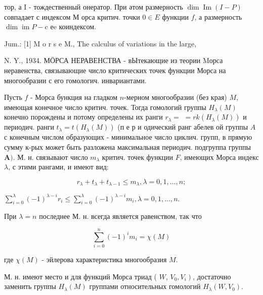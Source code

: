 \documentclass[10pt]{article}
\begin{document}
тор, а I - тождественный онератор. При әтом размерность $\operatorname{dim} \operatorname{Im}(I-P)$ совпадает с индексом М орса критич. точки $0 \in E$ функции $f$, а размерность $\operatorname{dim} \operatorname{im} P-\mathrm{c}$ еe коиндексом.



Jum.: [1] M o r s e M., The calculus of variations in the large,

N. Y., 1934. МӦРСА НЕРАВЕНСТВА - вЫтекающие из теории Mорса неравенства, связывающие число критических точек функции Морса на многообразии с его гомологич. инвариантами.



Пусть $f$ - Морса бункция на гладком $n$-мерном многообразии (без края) $M$, имеющая конечное число критич. точек. Тогда гомологий группы $H_{\lambda}(M)$ конечно порождены и потому определены их ранги $r_{\lambda}=$ $=r k\left(H_{\lambda}(M)\right)$ и периодич. ранги $t_{\lambda}=t\left(H_{\lambda}(M)\right)$ (п е р и одический ранг абелев ой группы $A$ с конечным числом образующих - минимальное число циклич. групп, в прямую сумму к-рых может быть разложена максимальная периодич. подгруппа группы $\boldsymbol{A})$. М. н. связывают число $m_{\lambda}$ критич. точек функции $F$, имеющих Морса индекс $\lambda$, с этими рангами, и имеют вид:



\[

r_{\lambda}+t_{\lambda}+t_{\lambda-1} \leqslant m_{\lambda}, \lambda=0,1, \ldots, n ;

\]



$\sum_{i=0}^{\lambda}(-1)^{\lambda-i} r_{i} \leqslant \sum_{i=0}^{\lambda}(-1)^{\lambda-i} m_{i}, \lambda=0,1, \ldots, n$.



При $\lambda=n$ последнее М. н. всегда является равенством, так что



\[

\sum_{i=0}^{n}(-1)^{i} m_{i}=\chi(M)

\]



где $\chi(M)$ - эйлерова характеристика многообразия $M$.



М. н. имеют место и для функций Морса триад ( $W$, $\left.V_{0}, V_{i}\right)$, достаточно заменить группы $H_{\lambda}(M)$ группами относительных гомологий $H_{\lambda}\left(W, V_{0}\right)$.
\end{document}
